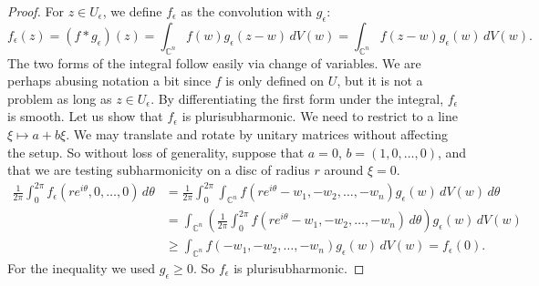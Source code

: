 \documentclass[12pt,openany]{book}
\newcommand{\C}{{\mathbb{C}}}
\theoremstyle{plain}
\theoremstyle{remark}
\theoremstyle{definition}
\theoremstyle{exercise}
\theoremstyle{example}
\begin{document}
\begin{proof}
For $z \in U_\epsilon$, we define $f_\epsilon$ as
the convolution with $g_\epsilon$:
%
\begin{equation*}
f_\epsilon(z) = (f * g_\epsilon)(z) =
\int_{\C^n} f(w) g_\epsilon (z-w) \, dV(w) =
\int_{\C^n} f(z-w) g_\epsilon (w) \, dV(w) .
\end{equation*}
The two forms of the integral follow easily via change of variables.
We are perhaps abusing notation a bit since $f$ is only defined on $U$,
but it is not a problem as long as $z \in
U_\epsilon$.
By differentiating the first form under the integral, $f_\epsilon$ is smooth.
Let us show that $f_\epsilon$ is plurisubharmonic.  We need to restrict to a
line $\xi \mapsto a+b\xi$.
We may translate and rotate by unitary matrices without affecting the setup.
So without loss of generality, suppose that $a = 0$, $b = (1,0,\ldots,0)$,
and that we are testing subharmonicity on a disc of radius $r$ around $\xi = 0$.
\begin{equation*}
\begin{split}
\frac{1}{2\pi} \int_0^{2\pi} f_\epsilon(re^{i\theta},0,\ldots,0)\, d\theta & =
\frac{1}{2\pi} \int_0^{2\pi}
\int_{\C^n}
f(re^{i\theta}-w_1,-w_2,\ldots,-w_n) g_\epsilon (w) \, dV(w) 
\,d\theta
\\
& =
\int_{\C^n}
\left(
\frac{1}{2\pi} \int_0^{2\pi}
f(re^{i\theta}-w_1,-w_2,\ldots,-w_n) \, d\theta \right) g_\epsilon (w) \, dV(w) 
\\
& \geq 
\int_{\C^n}
f(-w_1,-w_2,\ldots,-w_n) g_\epsilon (w) \, dV(w)  = f_\epsilon(0).
\end{split}
\end{equation*}
For the inequality we used $g_\epsilon \geq 0$.
So $f_\epsilon$ is plurisubharmonic.


\end{proof}
\end{document}
